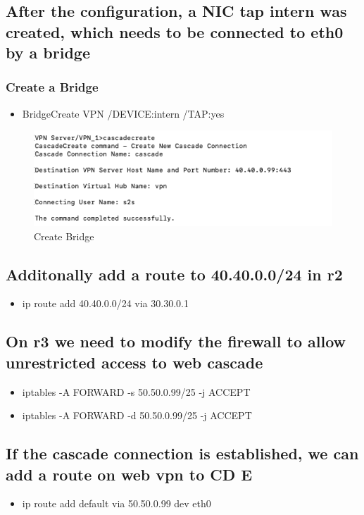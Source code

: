 \subsection{After the configuration, a NIC tap intern was created, which needs to be
connected to eth0 by a bridge}
\subsubsection{Create a Bridge}
\begin{itemize}
    \item BridgeCreate VPN /DEVICE:intern /TAP:yes
\end{itemize}
\begin{figure}[H]
\centering
  \includegraphics[width=1\textwidth]{Images/cascade_create.png}
  \caption{Create Bridge }
  \label{fig }
\end{figure}
\subsection{Additonally add a route to 40.40.0.0/24 in r2}
\begin{itemize}
    \item ip route add 40.40.0.0/24 via 30.30.0.1
\end{itemize}
\subsection{On r3 we need to modify the firewall to allow unrestricted access to web cascade}
\begin{itemize}
    \item iptables -A FORWARD -s 50.50.0.99/25  -j ACCEPT 
\end{itemize}
\begin{itemize}
    \item iptables -A FORWARD -d 50.50.0.99/25  -j ACCEPT
\end{itemize}
\subsection{If the cascade connection is established, we can add a route on web vpn to CD E}
\begin{itemize}
    \item ip route add default via  50.50.0.99 dev eth0
\end{itemize}
